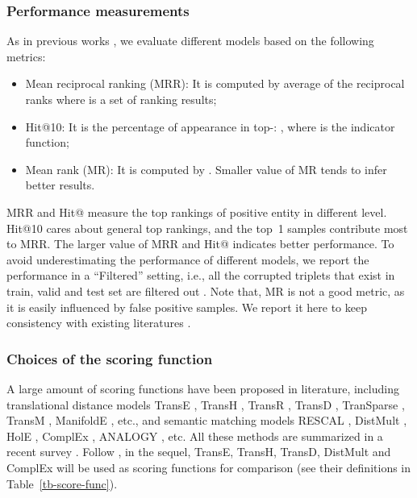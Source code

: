 \documentclass[conference]{IEEEtran}
\begin{document}
\subsubsection{Performance measurements}
As in previous works \cite{bordes2013translating,trouillon2016complex,wang2018incorporating,cai2018kbgan}
, we evaluate different models based on the following metrics:
\begin{itemize}
\item Mean reciprocal ranking (MRR):
It is computed by average of the reciprocal ranks 
where  is a set of ranking results;

\item Hit@10: 
It is the percentage of appearance in top-: , where  is the indicator function;


\item Mean rank (MR): It is computed by .
Smaller value of MR tends to infer better results.
\end{itemize}



MRR and Hit@ measure the top rankings of positive entity in different level. 
Hit@10 cares about general top rankings, and the top~1 samples contribute most to MRR.
The larger value of MRR and Hit@ indicates better performance.
To avoid underestimating the performance of different models, 
we report the performance in a ``Filtered'' setting, 
i.e., all the corrupted triplets that exist in train, valid and test set are filtered out \cite{wang2018incorporating,cai2018kbgan}. 
Note that, 
MR is not a good metric, 
as it is easily influenced by false positive samples.
We report it here to keep consistency with existing literatures 
\cite{wang2018incorporating,cai2018kbgan}.



\subsubsection{Choices of the scoring function}
A large amount of scoring functions have been proposed in literature, including 
translational distance models TransE \cite{bordes2013translating}, TransH \cite{wang2014knowledge}, TransR \cite{lin2015learning}, TransD \cite{ji2015knowledge}, TranSparse \cite{ji2016knowledge}, TransM \cite{fan2014transition}, ManifoldE \cite{xiao2016from}, etc., 
and semantic matching models RESCAL \cite{nickel2011three}, DistMult \cite{yang2014embedding}, HolE \cite{nickel2016holographic}, ComplEx \cite{trouillon2016complex}, ANALOGY \cite{liu2017analogical}, etc. 
All these methods are summarized in a recent survey \cite{wang2017knowledge}.
Follow \cite{cai2018kbgan,wang2018incorporating},
in the sequel, 
TransE, TransH, TransD, DistMult and ComplEx will be used as scoring functions for comparison
(see their definitions in Table~\ref{tb-score-func}).
\end{document}

